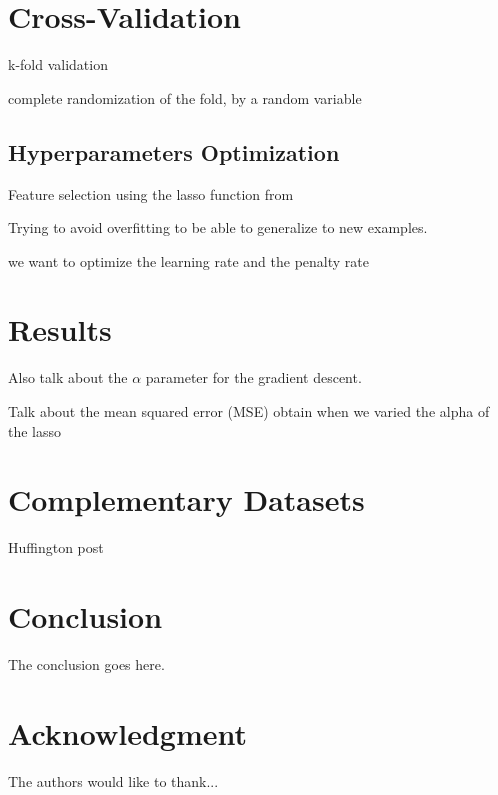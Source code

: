 \documentclass[conference]{IEEEtran}
\begin{document}
\section{Cross-Validation}

k-fold validation

complete randomization of the fold, by a random variable

\subsection{Hyperparameters Optimization}

Feature selection using the lasso function from \cite{scikit-learn}

Trying to avoid overfitting to be able to generalize to new examples.

we want to optimize the learning rate and the penalty rate

\section{Results}

Also talk about the $\alpha$ parameter for the gradient descent.

Talk about the mean squared error (MSE) obtain when we varied the alpha of the lasso 

\section{Complementary Datasets}

Huffington post


\section{Conclusion}
The conclusion goes here.






\section*{Acknowledgment}


The authors would like to thank...





\end{document}
